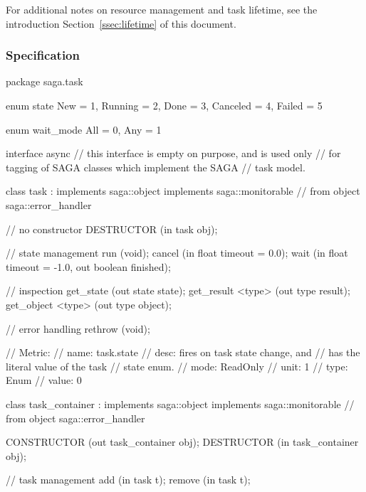   For additional notes on resource management and task lifetime,
  see the introduction Section~\ref{ssec:lifetime} of this
  document.
 
 \subsubsection{Specification}
 
 \begin{myspec}
  package saga.task
  {
    enum state
    {
      New       =  1,
      Running   =  2,
      Done      =  3,
      Canceled  =  4,
      Failed    =  5
    }
 
 
    enum wait_mode
    {
      All       =  0,
      Any       =  1
    }
 
 
    interface async
    {
      // this interface is empty on purpose, and is used only
      // for tagging of SAGA classes which implement the SAGA
      // task model.
    }
 
 
    class task : implements   saga::object
                 implements   saga::monitorable
              // from object  saga::error_handler
    {
      // no constructor
      DESTRUCTOR       (in  task            obj);
 
      // state management
      run               (void);
      cancel            (in  float           timeout =  0.0);
      wait              (in  float           timeout = -1.0,
                         out boolean         finished);
 
      // inspection
      get_state         (out state           state);
      get_result <type> (out type            result);
      get_object <type> (out type            object);
 
      // error handling
      rethrow           (void);
 
      // Metric:
      //   name:  task.state
      //   desc:  fires on task state change, and
      //          has the literal value of the task
      //          state enum.
      //   mode:  ReadOnly
      //   unit:  1
      //   type:  Enum
      //   value: 0
    }
 
 
    class task_container : implements   saga::object
                           implements   saga::monitorable
                        // from object  saga::error_handler
    {
      CONSTRUCTOR      (out task_container  obj);
      DESTRUCTOR       (in  task_container  obj);
 
      // task management
      add               (in  task            t);
      remove            (in  task            t);
 
}}
\end{myspec}
